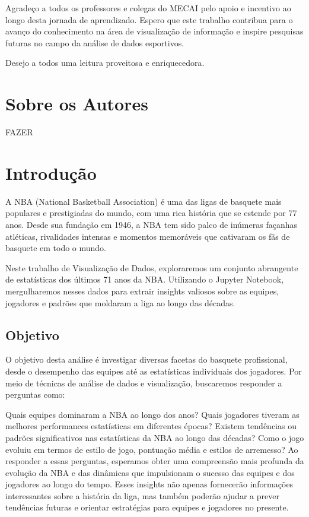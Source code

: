 \documentclass[
]{book}
\begin{document}
Agradeço a todos os professores e colegas do MECAI pelo apoio e incentivo ao longo desta jornada de aprendizado. Espero que este trabalho contribua para o avanço do conhecimento na área de visualização de informação e inspire pesquisas futuras no campo da análise de dados esportivos.

Desejo a todos uma leitura proveitosa e enriquecedora.

\hypertarget{author}{%
\chapter*{Sobre os Autores}\label{author}}

FAZER

\hypertarget{introduuxe7uxe3o}{%
\chapter{Introdução}\label{introduuxe7uxe3o}}

A NBA (National Basketball Association) é uma das ligas de basquete mais populares e prestigiadas do mundo, com uma rica história que se estende por 77 anos. Desde sua fundação em 1946, a NBA tem sido palco de inúmeras façanhas atléticas, rivalidades intensas e momentos memoráveis que cativaram os fãs de basquete em todo o mundo.

Neste trabalho de Visualização de Dados, exploraremos um conjunto abrangente de estatísticas dos últimos 71 anos da NBA. Utilizando o Jupyter Notebook, mergulharemos nesses dados para extrair insights valiosos sobre as equipes, jogadores e padrões que moldaram a liga ao longo das décadas.

\hypertarget{objetivo}{%
\section{Objetivo}\label{objetivo}}

O objetivo desta análise é investigar diversas facetas do basquete profissional, desde o desempenho das equipes até as estatísticas individuais dos jogadores. Por meio de técnicas de análise de dados e visualização, buscaremos responder a perguntas como:

Quais equipes dominaram a NBA ao longo dos anos? Quais jogadores tiveram as melhores performances estatísticas em diferentes épocas? Existem tendências ou padrões significativos nas estatísticas da NBA ao longo das décadas? Como o jogo evoluiu em termos de estilo de jogo, pontuação média e estilos de arremesso? Ao responder a essas perguntas, esperamos obter uma compreensão mais profunda da evolução da NBA e das dinâmicas que impulsionam o sucesso das equipes e dos jogadores ao longo do tempo. Esses insights não apenas fornecerão informações interessantes sobre a história da liga, mas também poderão ajudar a prever tendências futuras e orientar estratégias para equipes e jogadores no presente.
\end{document}
